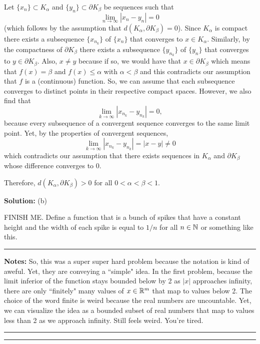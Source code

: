 \documentclass{article}
\begin{document}
Let $\{x_n\}\subset K_\alpha$ and $\{y_n\}\subset \partial K_\beta$ be sequences such that 
	\[ \lim_{n\to\infty} |x_n - y_n| = 0\]
(which follows by the assumption that $d(K_\alpha,\partial K_\beta) = 0$). Since $K_\alpha$ is compact there exists a subsequence $\{x_{n_k}\}$ of $\{x_n\}$ that converges to $x\in K_\alpha$. Similarly, by the compactness of $\partial K_\beta$ there exists a subsequence $\{y_{n_k}\}$ of $\{y_n\}$ that converges to $y\in \partial K_\beta$. Also, $x\neq y$ because if so, we would have that $x \in \partial K_\beta$ which means that $f(x) = \beta$ and $f(x) \leq \alpha$ with $\alpha < \beta$ and this contradicts our assumption that $f$ is a (continuous) function. So, we can assume that each subsequence converges to distinct points in their respective compact spaces. However, we also find that 
	\[\lim_{k\to\infty} |x_{n_k} - y_{n_k}| = 0,\]
because every subsequence of a convergent sequence converges to the same limit point. Yet, by the properties of convergent sequences, 
\[\lim_{k\to\infty} |x_{n_k} - y_{n_k}| = |x - y| \neq 0\]
which contradicts our assumption that there exists sequences in $K_\alpha$ and $\partial K_\beta$ whose difference converges to 0. 

Therefore, $d(K_\alpha,\partial K_\beta) > 0$ for all $0 < \alpha < \beta < 1$. 


\textbf{Solution:} (b)

FINISH ME. Define a function that is a bunch of spikes that have a constant height and the width of each spike is equal to $1/n$ for all $n\in \mathbb N$ or something like this.\\

\hrule

\textbf{Notes:} So, this was a super super hard problem because the notation is kind of aweful. Yet, they are conveying a ``simple" idea. In the first problem, because the limit inferior of the function stays bounded below by 2 as $|x|$ approaches infinity, there are only ``finitely" many values of $x\in \mathbb R^m$ that map to values below 2. The choice of the word finite is weird because the real numbers are uncountable. Yet, we can visualize the idea as a bounded subset of real numbers that map to values less than 2 as we approach infinity. Still feels weird. You're tired.\\

\hrule \vspace{2pts}
\hrule

\break
\end{document}
